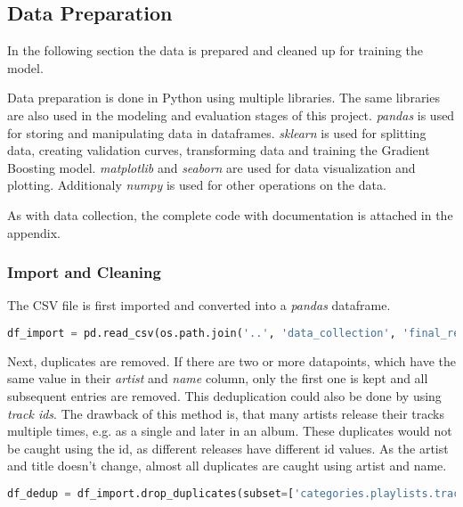 \subsection{Data Preparation}
\label{sec:Data Preparation}

In the following section the data is prepared and cleaned up for training the model.

Data preparation is done in Python using multiple libraries. The same libraries
are also used in the modeling and evaluation stages of this project.
\emph{pandas} is used for storing and manipulating data in dataframes.
\emph{sklearn} is used for splitting data, creating validation curves,
transforming data and training the Gradient Boosting model.
\emph{matplotlib} and \emph{seaborn} are used for data visualization and plotting.
Additionaly \emph{numpy} is used for other operations on the data.

As with data collection, the complete code with documentation is attached in the appendix.

\subsubsection{Import and Cleaning}


The CSV file is first imported and converted into a \emph{pandas} dataframe.

\begin{lstlisting}[language=Python]
    df_import = pd.read_csv(os.path.join('..', 'data_collection', 'final_result.csv'))
\end{lstlisting}

Next, duplicates are removed. If there are two or more datapoints, which have the same value in their \emph{artist}
and \emph{name} column, only the first one is kept and all subsequent entries are removed.
This deduplication could also be done by using \emph{track ids}. The drawback of this method is, that many artists
release their tracks multiple times, e.g. as a single and later in an album. These duplicates would not be
caught using the id, as different releases have different id values. As the artist and title doesn't change, almost
all duplicates are caught using artist and name.

\begin{lstlisting}[language=Python]
    df_dedup = df_import.drop_duplicates(subset=['categories.playlists.tracks.artists', 'categories.playlists.tracks.name'])
\end{lstlisting}

